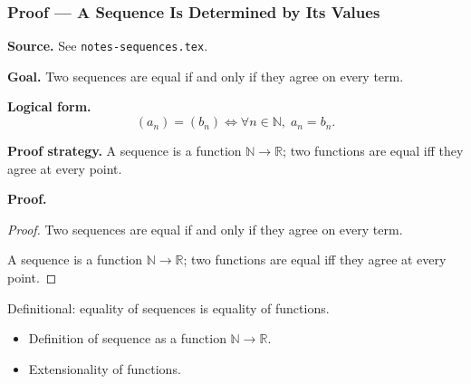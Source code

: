 
\clearpage
{}
\hypertarget{proof-RA-ABB-T-seq-determined-by-values}{}

\subsubsection[A Sequence Is Determined by Its Values]{Proof --- A Sequence Is Determined by Its Values}

\bigskip

\noindent
\textbf{Source.}
See \texttt{notes-sequences.tex}.

\vspace{0.75em}

\noindent
\textbf{Goal.}
Two sequences are equal if and only if they agree on every term.

\vspace{0.75em}

\noindent
\textbf{Logical form.}
\[
  (a_n) = (b_n) \Longleftrightarrow \forall n \in \mathbb{N},\; a_n = b_n.
\]

\vspace{0.75em}

\noindent
\textbf{Proof strategy.}
A sequence is a function $\mathbb{N} \to \mathbb{R}$; two functions are equal iff they agree at every point.

\vspace{0.75em}

\noindent
\textbf{Proof.}
\begin{proof}
\Claim Two sequences are equal if and only if they agree on every term.

\Given 

\Goal 

\Strategy A sequence is a function $\mathbb{N} \to \mathbb{R}$; two functions are equal iff they agree at every point.

\medskip


\end{proof}

\begin{remark*}
Definitional: equality of sequences is equality of functions.
\end{remark*}

\begin{remark*}[Dependencies]
\begin{itemize}
  \item Definition of sequence as a function $\mathbb{N} \to \mathbb{R}$.
  \item Extensionality of functions.
\end{itemize}
\end{remark*}
